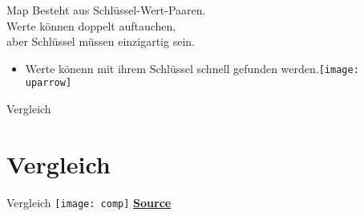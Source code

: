 \documentclass[10pt]{beamer}
\begin{document}
\begin{frame}[fragile]{Map}
Besteht aus Schlüssel-Wert-Paaren.\\
Werte können doppelt auftauchen,\\
aber Schlüssel müssen einzigartig sein.

\begin{itemize}
\item Werte könenn mit ihrem Schlüssel schnell gefunden werden.\texttt{[image: uparrow]}
\end{itemize}
\end{frame}

\begin{frame}[fragile]{Vergleich}
\section{Vergleich}
\end{frame}

\begin{frame}[fragile]{Vergleich}
\texttt{[image: comp]}
\textcolor{mymauve}{\textbf{\href{https://i0.wp.com/www.lavivienpost.com/wp-content/uploads/2018/04/Java-collections-cheat-sheet2.jpg?resize=768 2C500&ssl=1}{Source}}}
\end{frame}
\end{document}
